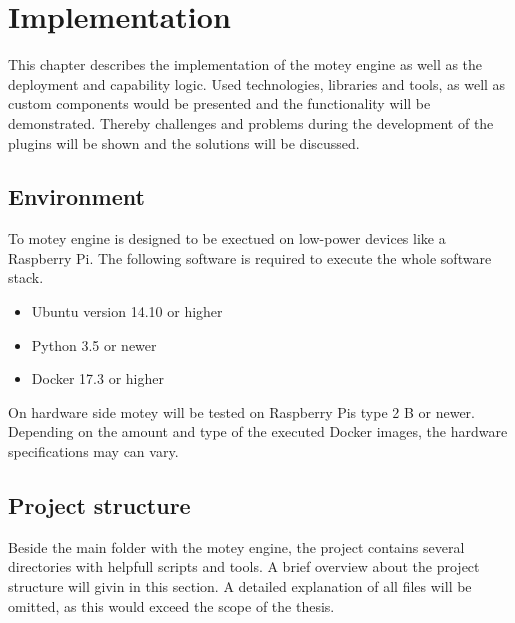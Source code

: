 \chapter{Implementation}\label{chapter:implementation}
This chapter describes the implementation of the motey engine as well as the deployment and capability logic.
Used technologies, libraries and tools, as well as custom components would be presented and the functionality will be demonstrated.
Thereby challenges and problems during the development of the plugins will be shown and the solutions will be discussed.

\section{Environment}
To motey engine is designed to be exectued on low-power devices like a Raspberry Pi.
The following software is required to execute the whole software stack.
\begin{itemize}
  \item Ubuntu version 14.10 or higher
  \item Python 3.5 or newer
  \item Docker 17.3 or higher
\end{itemize}
On hardware side motey will be tested on Raspberry Pis type 2 B or newer.
Depending on the amount and type of the executed Docker images, the hardware specifications may can vary.

\section{Project structure}

Beside the main folder with the motey engine, the project contains several directories with helpfull scripts and tools.
A brief overview about the project structure will givin in this section.
A detailed explanation of all files will be omitted, as this would exceed the scope of the thesis.

